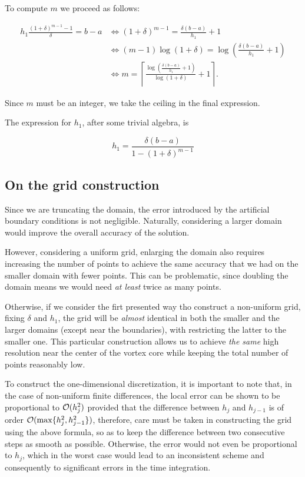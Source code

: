To compute $m$ we proceed as follows:

\begin{align*}
    h_1 \frac{(1+\delta)^{m-1} - 1}{\delta} = b-a 
    &\iff (1+\delta)^{m-1} = \frac{\delta(b-a)}{h_1} + 1 \\
    &\iff (m-1)\log(1+\delta) = \log\!\left(\frac{\delta(b-a)}{h_1} + 1\right) \\
    &\iff m = \left\lceil \frac{\log\!\left(\tfrac{\delta(b-a)}{h_1} + 1\right)}{\log(1+\delta)} + 1 \right\rceil.
\end{align*}

Since $m$ must be an integer, we take the ceiling in the final expression.

The expression for $h_1$, after some trivial algebra, is

\[ h_1 = \frac{\delta(b - a)}{1 - (1 + \delta)^{m - 1}} \]

\subsection{On the grid construction}

Since we are truncating the domain, the error introduced by the artificial boundary conditions is not negligible. Naturally, considering a larger domain would improve the overall accuracy of the solution. 

However, considering a uniform grid, enlarging the domain also requires increasing the number of points to achieve the same accuracy that we had on the smaller domain with fewer points. This can be problematic, since doubling the domain means we would need \emph{at least} twice as many points.

Otherwise, if we consider the firt presented way tho construct a non-uniform grid, fixing $\delta$ and $h_1$, the grid will be \emph{almost} identical in both the smaller and the larger domains (except near the boundaries), with restricting the latter to the smaller one. This particular construction allows us to achieve \emph{the same} high resolution near the center of the vortex core while keeping the total number of points reasonably low.

\medskip

To construct the one-dimensional discretization, it is important to note that, in the case of non-uniform finite differences, the local error can be shown to be proportional to $\mathcal{O}(h_j^2)$ provided that the difference between $h_j$ and $h_{j-1}$ is of order $\mathcal{O}(\max\{h_j^2, h_{j-1}^2\})$, therefore, care must be taken in constructing the grid using the above formula, so as to keep the difference between two consecutive steps as smooth as possible. Otherwise, the error would not even be proportional to $h_j$, which in the worst case would lead to an inconsistent scheme and consequently to significant errors in the time integration.

